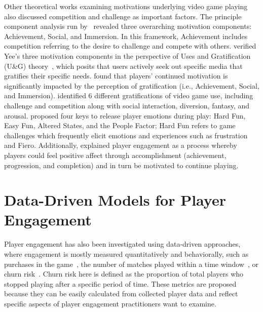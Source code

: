 Other theoretical works examining motivations underlying video game playing also discussed competition and challenge as important factors. The principle component analysis run by~\textcite{yee2006motivations} revealed three overarching motivation components: Achievement, Social, and Immersion. In this framework, Achievement includes competition referring to the desire to challenge and compete with others. \textcite{wu2010falling} verified Yee's three motivation components in the perspective of Uses and Gratification (U\&G) theory~\citep{palmgreen1985uses}, which posits that users actively seek out specific media that gratifies their specific needs. \textcite{wu2010falling} found that players' continued motivation is significantly impacted by the perception of gratification (i.e., Achievement, Social, and Immersion). \textcite{sherry2006video} identified 6 different gratifications of video game use, including challenge and competition along with social interaction, diversion, fantasy, and arousal. \textcite{lazzaro2004we} proposed four keys to release player emotions during play: Hard Fun, Easy Fun, Altered States, and the People Factor; Hard Fun refers to game challenges which frequently elicit emotions and experiences such as frustration and Fiero. Additionally, \textcite{schoenau2011player} explained player engagement as a process whereby players could feel positive affect through accomplishment (achievement, progression, and completion) and in turn be motivated to continue playing.  

 




\section{Data-Driven Models for Player Engagement}\label{sec:rw_data_player_engage}

Player engagement has also been investigated using data-driven approaches, where engagement is mostly measured quantitatively and behaviorally, such as purchases in the game~\citep{xie2015predicting,sifa2015predicting}, the number of matches played within a time window~\citep{xue2017dynamic,weber2011modeling}, or churn risk~\citep{hadiji2014predicting,harrison2012players}. Churn risk here is defined as the proportion of total players who stopped playing after a specific period of time. These metrics are proposed because they can be easily calculated from collected player data and reflect specific aspects of player engagement practitioners want to examine.

